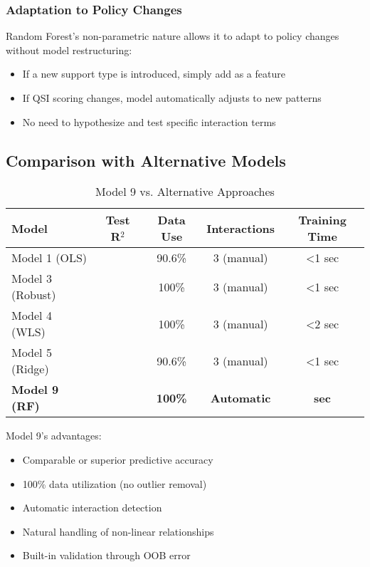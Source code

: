 \subsubsection{Adaptation to Policy Changes}

Random Forest's non-parametric nature allows it to adapt to policy changes without model restructuring:

\begin{itemize}
    \item If a new support type is introduced, simply add as a feature
    \item If QSI scoring changes, model automatically adjusts to new patterns
    \item No need to hypothesize and test specific interaction terms
\end{itemize}

\subsection{Comparison with Alternative Models}

\begin{table}[h]
\centering
\caption{Model 9 vs. Alternative Approaches}
\begin{tabular}{lcccc}
\toprule
\textbf{Model} & \textbf{Test R$^2$} & \textbf{Data Use} & \textbf{Interactions} & \textbf{Training Time} \\
\midrule
Model 1 (OLS) & \ModelOneRSquaredTest{} & 90.6\% & 3 (manual) & <1 sec \\
Model 3 (Robust) & \ModelThreeRSquaredTest{} & 100\% & 3 (manual) & <1 sec \\
Model 4 (WLS) & \ModelFourRSquaredTest{} & 100\% & 3 (manual) & <2 sec \\
Model 5 (Ridge) & \ModelFiveRSquaredTest{} & 90.6\% & 3 (manual) & <1 sec \\
\textbf{Model 9 (RF)} & \textbf{\ModelNineRSquaredTest{}} & \textbf{100\%} & \textbf{Automatic} & \textbf{\ModelNineTrainingTime{} sec} \\
\bottomrule
\end{tabular}
\label{tab:model9_comparison}
\end{table}

Model 9's advantages:
\begin{itemize}
    \item Comparable or superior predictive accuracy
    \item 100\% data utilization (no outlier removal)
    \item Automatic interaction detection
    \item Natural handling of non-linear relationships
    \item Built-in validation through OOB error
\end{itemize}

